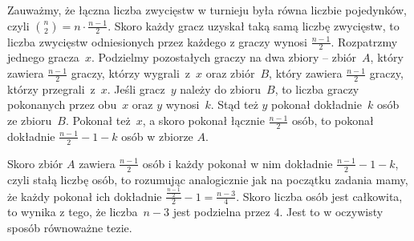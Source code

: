 \noindent
Zauważmy, że łączna liczba zwycięstw w turnieju była równa liczbie pojedynków, czyli ${{n}\choose{2}} = n \cdot \frac{n - 1}{2}$. Skoro każdy gracz uzyskał taką samą liczbę zwycięstw, to liczba zwycięstw odniesionych przez każdego z graczy wynosi $\frac{n - 1}{2}$.
Rozpatrzmy jednego gracza~$x$. Podzielmy pozostałych graczy na dwa zbiory -- zbiór~$A$, który zawiera $\frac{n - 1}{2}$ graczy, którzy wygrali~z~$x$ oraz zbiór~$B$, który zawiera $\frac{n - 1}{2}$ graczy, którzy przegrali~z~$x$. 
Jeśli gracz~$y$ należy do zbioru~$B$, to liczba graczy pokonanych przez obu~$x$ oraz $y$ wynosi~$k$. Stąd też $y$ pokonał dokładnie~$k$ osób ze zbioru~$B$. Pokonał też~$x$, a skoro pokonał łącznie $\frac{n - 1}{2}$ osób, to pokonał dokładnie $\frac{n - 1}{2} - 1 - k$ osób w zbiorze $A$.

\begin{center}
\end{center}

\vspace{10px}
\noindent
Skoro zbiór $A$ zawiera $\frac{n - 1}{2}$ osób i każdy pokonał w nim dokładnie $\frac{n - 1}{2} - 1 - k$, czyli stałą liczbę osób, to rozumując analogicznie jak na początku zadania mamy, że każdy pokonał ich dokładnie $\frac{\frac{n - 1}{2}}{2} - 1 = \frac{n - 3}{4}$. Skoro liczba osób jest całkowita, to wynika z tego, że liczba~$n - 3$ jest podzielna przez $4$. Jest to w oczywisty sposób równoważne tezie.


